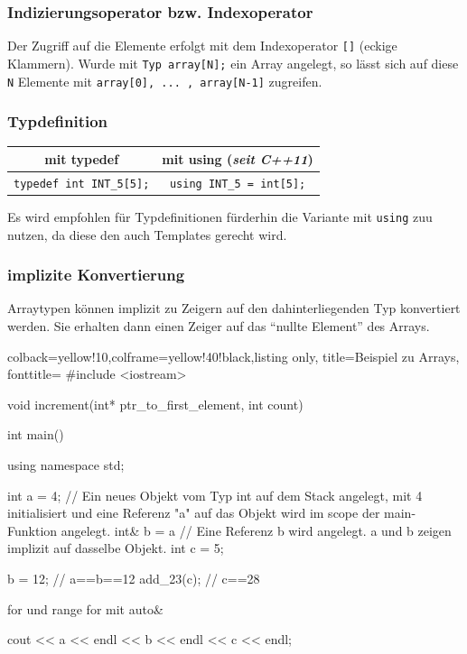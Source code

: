 \documentclass[a4paper]{report}
\begin{document}
\subsubsection{Indizierungsoperator bzw. Indexoperator}

Der Zugriff auf die Elemente erfolgt mit dem Indexoperator \texttt{[]} (eckige Klammern). Wurde mit \texttt{Typ array[N];} ein Array angelegt, so lässt sich auf diese \texttt{N} Elemente mit \texttt{array[0], ... , array[N-1]} zugreifen.

\subsubsection{Typdefinition}
\begin{center}
\begin{tabular}{|c|c|} \hline
	\textbf{mit typedef} & \textbf{mit using {\small (\textit{seit C++11})}} \\ \hline
	\texttt{typedef int INT\_5[5];} & \texttt{using INT\_5 = int[5];} \\ \hline
\end{tabular}
\end{center}

Es wird empfohlen für Typdefinitionen fürderhin die Variante mit \texttt{using} zuu nutzen, da diese den auch Templates gerecht wird. 

\subsubsection{implizite Konvertierung}

Arraytypen können implizit zu Zeigern auf den dahinterliegenden Typ konvertiert werden. Sie erhalten dann einen Zeiger auf das "`nullte Element"' des Arrays.

\begin{tcblisting}{colback=yellow!10,colframe=yellow!40!black,listing only,
		title=Beispiel zu Arrays, fonttitle=\bfseries}
	#include <iostream>
	
	void increment(int* ptr_to_first_element, int count){
		
	}
	
	int main(){
		using namespace std;
		
		int a = 4; // Ein neues Objekt vom Typ int auf dem Stack angelegt, mit 4 initialisiert und eine Referenz "a" auf das Objekt wird im scope der main-Funktion angelegt.
		int& b = a // Eine Referenz b wird angelegt. a und b zeigen implizit auf dasselbe Objekt.
		int c = 5;
		
		b = 12; // a==b==12
		add_23(c); // c==28
		
		for und range for mit auto&
		
		cout << a << endl << b << endl << c << endl; 
	}
\end{tcblisting}
\end{document}
